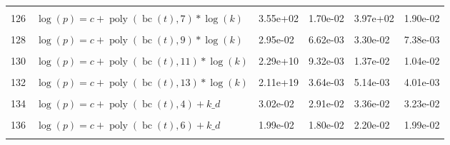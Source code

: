 \documentclass[12pt,a4paper]{article}
\DeclareMathOperator{\bc}{bc}
\DeclareMathOperator{\poly}{poly}
\begin{document}
\begin{longtable}[t]{ll>{\raggedleft\arraybackslash}p{2cm}>{\raggedleft\arraybackslash}p{2cm}>{\raggedleft\arraybackslash}p{2cm}>{\raggedleft\arraybackslash}p{2cm}}
\cellcolor{gray!6}{125} & \cellcolor{gray!6}{$\log(p) = c + \poly\left( \bc(t), 6 \right) * \log(k)$} & \cellcolor{gray!6}{1.31e-02} & \cellcolor{gray!6}{6.77e-03} & \cellcolor{gray!6}{1.46e-02} & \cellcolor{gray!6}{7.55e-03}\\
126 & $\log(p) = c + \poly\left( \bc(t), 7 \right) * \log(k)$ & 3.55e+02 & 1.70e-02 & 3.97e+02 & 1.90e-02\\
\cellcolor{gray!6}{127} & \cellcolor{gray!6}{$\log(p) = c + \poly\left( \bc(t), 8 \right) * \log(k)$} & \cellcolor{gray!6}{2.23e-01} & \cellcolor{gray!6}{1.38e-02} & \cellcolor{gray!6}{2.50e-01} & \cellcolor{gray!6}{1.54e-02}\\
128 & $\log(p) = c + \poly\left( \bc(t), 9 \right) * \log(k)$ & 2.95e-02 & 6.62e-03 & 3.30e-02 & 7.38e-03\\
\cellcolor{gray!6}{129} & \cellcolor{gray!6}{$\log(p) = c + \poly\left( \bc(t), 10 \right) * \log(k)$} & \cellcolor{gray!6}{1.44e+01} & \cellcolor{gray!6}{1.09e-02} & \cellcolor{gray!6}{1.61e+01} & \cellcolor{gray!6}{1.22e-02}\\
130 & $\log(p) = c + \poly\left( \bc(t), 11 \right) * \log(k)$ & 2.29e+10 & 9.32e-03 & 1.37e-02 & 1.04e-02\\
\cellcolor{gray!6}{131} & \cellcolor{gray!6}{$\log(p) = c + \poly\left( \bc(t), 12 \right) * \log(k)$} & \cellcolor{gray!6}{4.09e+18} & \cellcolor{gray!6}{5.92e-03} & \cellcolor{gray!6}{2.53e-01} & \cellcolor{gray!6}{6.59e-03}\\
132 & $\log(p) = c + \poly\left( \bc(t), 13 \right) * \log(k)$ & 2.11e+19 & 3.64e-03 & 5.14e-03 & 4.01e-03\\
\cellcolor{gray!6}{133} & \cellcolor{gray!6}{$\log(p) = c + \poly\left( \bc(t), 3 \right) + k\_d$} & \cellcolor{gray!6}{2.57e-02} & \cellcolor{gray!6}{1.98e-02} & \cellcolor{gray!6}{2.85e-02} & \cellcolor{gray!6}{2.18e-02}\\
134 & $\log(p) = c + \poly\left( \bc(t), 4 \right) + k\_d$ & 3.02e-02 & 2.91e-02 & 3.36e-02 & 3.23e-02\\
\cellcolor{gray!6}{135} & \cellcolor{gray!6}{$\log(p) = c + \poly\left( \bc(t), 5 \right) + k\_d$} & \cellcolor{gray!6}{2.26e-02} & \cellcolor{gray!6}{1.85e-02} & \cellcolor{gray!6}{2.51e-02} & \cellcolor{gray!6}{2.05e-02}\\
136 & $\log(p) = c + \poly\left( \bc(t), 6 \right) + k\_d$ & 1.99e-02 & 1.80e-02 & 2.20e-02 & 1.99e-02\\
\cellcolor{gray!6}{137} & \cellcolor{gray!6}{$\log(p) = c + \poly\left( \bc(t), 7 \right) + k\_d$} & \cellcolor{gray!6}{1.75e-02} & \cellcolor{gray!6}{1.73e-02} & \cellcolor{gray!6}{1.94e-02} & \cellcolor{gray!6}{1.91e-02}\\

\end{longtable}
\end{document}
